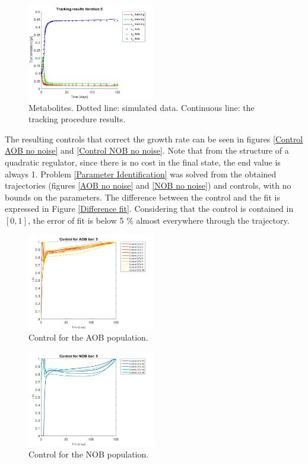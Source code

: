 \documentclass[3p,times]{elsarticle}
\begin{document}
\begin{figure}[h]
	\centering
	\includegraphics[width=0.5\textwidth]{Synthetic_data_no_noise//221119_no_noise_metabolites_Iter_5}
	\caption{Metabolites. Dotted line: simulated data. Continuous line: the tracking procedure results.}
	\label{Metabolites no noise}
\end{figure}
\clearpage

The resulting controls that correct the growth rate can be seen in figures \eqref{Control AOB no noise} and \eqref{Control NOB no noise}. Note that from the structure of a quadratic regulator, since there is no cost in the final state, the end value is always 1. Problem \eqref{Parameter Identification} was solved from the obtained trajectories (figures \eqref{AOB no noise} and \eqref{NOB no noise}) and controls, with no bounds on the parameters. The difference between the control and the fit is expressed in Figure \ref{Difference fit}. Considering that the control is contained in $[0,1]$, the error of fit is below 5 \% almost everywhere through the trajectory.

\begin{figure}[h]
	\centering
	\includegraphics[width=0.5\textwidth]{Synthetic_data_no_noise//221119_no_noise_Control_AOB_Iter_5}
	\caption{Control for the AOB population.}
	\label{Control AOB no noise}
\end{figure}
\begin{figure}[h]
	\centering
	\includegraphics[width=0.5\textwidth]{Synthetic_data_no_noise//221119_no_noise_Control_NOB_Iter_5}
	\caption{Control for the NOB population.}
	\label{Control NOB no noise}
\end{figure}
\end{document}
